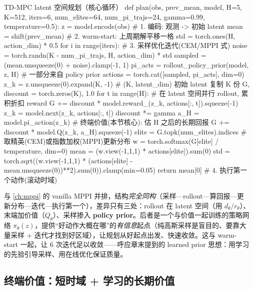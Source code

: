 \begin{codebox}[Python]{TD-MPC latent 空间规划（核心循环）}
def plan(obs, prev_mean, model, H=5, K=512, iters=6, num_elites=64,
         num_pi_trajs=24, gamma=0.99, temperature=0.5):
    z = model.encode(obs)                    # 1. 编码: 观测 -> 初始 latent
    mean = shift(prev_mean)                  # 2. warm-start: 上周期解平移一格
    std  = torch.ones(H, action_dim) * 0.5
    for i in range(iters):                   # 3. 采样优化迭代(CEM/MPPI 式)
        noise   = torch.randn(K - num_pi_trajs, H, action_dim) * std
        sampled = (mean.unsqueeze(0) + noise).clamp(-1, 1)
        pi_acts = rollout_policy_prior(model, z, H)   # 一部分来自 policy prior
        actions = torch.cat([sampled, pi_acts], dim=0)
        z_k = z.unsqueeze(0).expand(K, -1)   # (K, latent_dim) 初始 latent 复制 K 份
        G, discount = torch.zeros(K), 1.0
        for t in range(H):                   # 在 latent 空间并行 rollout, 累积折扣 reward
            G   += discount * model.reward_(z_k, actions[:, t]).squeeze(-1)
            z_k  = model.next(z_k, actions[:, t])
            discount *= gamma
        a_H = model.pi_action(z_k)           # 终端价值(本节核心): 估 H 之后的长期回报
        G  += discount * model.Q(z_k, a_H).squeeze(-1)
        elite = G.topk(num_elites).indices   # 取精英(CEM)或指数加权(MPPI)更新分布
        w     = torch.softmax(G[elite] / temperature, dim=0)
        mean  = (w.view(-1,1,1) * actions[elite]).sum(0)
        std   = torch.sqrt((w.view(-1,1,1) *
                  (actions[elite] - mean.unsqueeze(0))**2).sum(0)).clamp(min=0.05)
    return mean[0]                           # 4. 执行第一个动作(滚动时域)
\end{codebox}

\noindent 与 \cref{ch:mppi} 的 vanilla MPPI 并排，结构\emph{完全同构}（采样—rollout—算回报—更新分布—迭代—执行第一个），差异只有三处：rollout 在 latent 空间（用 $d_\theta/r_\theta$）、末端加价值（$Q_\theta$）、采样掺入 \textbf{policy prior}。后者是一个与价值一起训练的策略网络 $\pi_\theta(z)$，提供“好动作大概在哪”的\emph{有信息}起点（纯高斯采样是盲目的、要靠大量采样 $+$ 迭代才找到好区域），让规划从好起点出发、快速收敛。这与 warm-start 一起，让 $6$ 次迭代足以收敛——呼应章末提到的 learned prior 思想：用学习的先验引导采样、用在线优化保证质量。

\subsection{终端价值：短时域 + 学习的长期价值}
\label{sec:mv-tdmpc-value}

